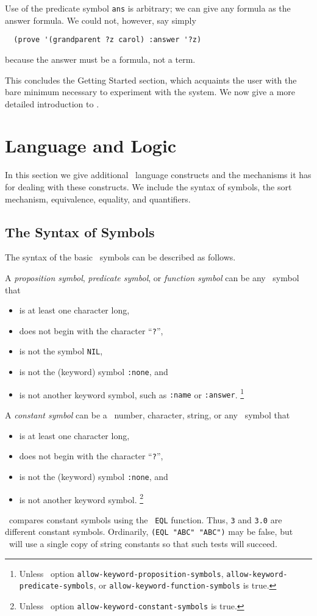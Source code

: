 Use of the predicate symbol {\tt ans} is arbitrary; we can give any
formula as the answer formula.   We could not, however, say simply
\begin{verbatim}
  (prove '(grandparent ?z carol) :answer '?z)
\end{verbatim}
because the answer must be a formula, not a term.


This concludes the Getting Started section, which acquaints the user
with the bare minimum necessary to experiment with the system.  We now
give a more detailed introduction to \snark\/.

\section{Language and Logic}
\label{sec-language-and-logic}

In this section we give additional \snark\  language constructs and the
mechanisms it has for dealing with these constructs.  We include the syntax
of symbols, the
sort mechanism, equivalence, equality, and quantifiers.

\subsection{The Syntax of Symbols}
\label{subsec-symbol-syntax}
The syntax of the basic \snark\  symbols can be described as follows.

A {\em proposition symbol}, {\em predicate symbol}, or {\em function symbol}
can be any \lisp\   symbol that
\begin{itemize}
\item is at least one character long,
\item does not begin with the character ``{\tt ?}'',
\item is not the symbol {\tt NIL},
\item is not the (keyword) symbol {\tt :none}, and
\item is not another keyword symbol, such as {\tt :name} or {\tt :answer}.
\footnote{Unless \snark\  option
{\tt allow-keyword-proposition-symbols},
{\tt allow-keyword-predicate-symbols}, or
{\tt allow-keyword-function-symbols} is true.}
\end{itemize}

A {\em constant symbol}
can be a \lisp\   number, character, string,
or any \lisp\   symbol that
\begin{itemize}
\item is at least one character long,
\item does not begin with the character ``{\tt ?}'',
\item is not the (keyword) symbol {\tt :none}, and
\item is not another keyword symbol.
\footnote{Unless \snark\  option
{\tt allow-keyword-constant-symbols} is true.}
\end{itemize}
\Snark\  compares constant symbols using the \lisp\   {\tt EQL} function.
Thus, {\tt 3} and {\tt 3.0} are different constant symbols.
Ordinarily, {\tt (EQL "ABC" "ABC")} may be false, but \snark\  will
use a single copy of string constants so that such tests will succeed.

